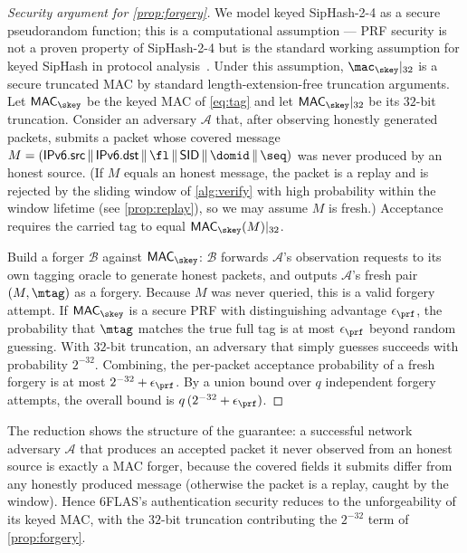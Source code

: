 \begin{proof}[Security argument for \cref{prop:forgery}]
We model keyed SipHash-2-4 as a secure pseudorandom function; this is a
computational assumption --- PRF security is not a proven property of SipHash-2-4
but is the standard working assumption for keyed SipHash in protocol
analysis~\cite{siphash}. Under this assumption, $\mac_{\skey}|_{32}$ is a
secure truncated MAC by standard length-extension-free truncation arguments.
Let $\textsf{MAC}_{\skey}$ be the keyed MAC of \cref{eq:tag} and let
$\textsf{MAC}_{\skey}|_{32}$ be its $32$-bit truncation. Consider an adversary
$\mathcal{A}$ that, after observing honestly generated packets, submits a packet
whose covered message $M=(\textsf{IPv6.src}\,\|\,\textsf{IPv6.dst}\,\|\,\fl\,\|\,\textsf{SID}\,\|\,\domid\,\|\,\seq)$ was never
produced by an honest source. (If $M$ equals an honest message, the packet is a
replay and is rejected by the sliding window of \cref{alg:verify} with
high probability within the window lifetime (see \cref{prop:replay}), so we may assume $M$ is
fresh.) Acceptance requires the carried tag to equal
$\textsf{MAC}_{\skey}(M)|_{32}$.

Build a forger $\mathcal{B}$ against $\textsf{MAC}_{\skey}$: $\mathcal{B}$
forwards $\mathcal{A}$'s observation requests to its own tagging oracle to
generate honest packets, and outputs $\mathcal{A}$'s fresh pair
$(M,\mtag)$ as a forgery. Because $M$ was never queried, this is a valid forgery
attempt. If $\textsf{MAC}_{\skey}$ is a secure PRF with distinguishing advantage
$\epsilon_{\prf}$, the probability that $\mtag$ matches the true full tag is at
most $\epsilon_{\prf}$ beyond random guessing. With $32$-bit truncation, an
adversary that simply guesses succeeds with probability $2^{-32}$. Combining,
the per-packet acceptance probability of a fresh forgery is at most
$2^{-32}+\epsilon_{\prf}$. By a union bound over $q$ independent forgery
attempts, the overall bound is $q\,(2^{-32}+\epsilon_{\prf})$.
\end{proof}

The reduction shows the structure of the guarantee: a successful network
adversary $\mathcal{A}$ that produces an accepted packet it never observed from
an honest source is exactly a MAC forger, because the covered fields it submits
differ from any honestly produced message (otherwise the packet is a replay,
caught by the window). Hence 6FLAS's authentication security reduces to the
unforgeability of its keyed MAC, with the $32$-bit truncation contributing the
$2^{-32}$ term of \cref{prop:forgery}.
